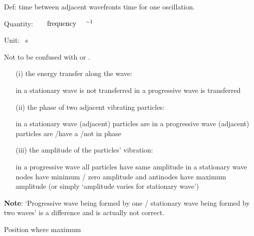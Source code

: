 \begin{question}%

  Def: time between adjacent wavefronts \OR time for one oscillation.

  Quantity: $\text{\refterm{frequency}}\ ^{-1}$

  Unit: \SI{}{s}

  Not to be confused with  or .
\end{question}

\begin{question}%

  \begin{itemize}
    \item [(i)] the energy transfer along the wave:
      
      in a stationary wave  is not transferred \OR in a progressive wave  is transferred~\hfill{}

    \item [(ii)] the phase of two adjacent vibrating particles:

      in a stationary wave (adjacent) particles are  \OR in a progressive wave (adjacent) particles are /have a /not in phase~\hfill{}

    \item [(iii)] the amplitude of the particles' vibration:

      in a progressive wave all particles have same amplitude \OR in a stationary wave nodes have minimum / zero amplitude and antinodes have maximum amplitude
        (or simply `amplitude varies for stationary wave')~\hfill{}
  \end{itemize}

  \textbf{Note}: `Progressive wave being formed by one / stationary wave being formed by two waves' is \NOT a difference and is actually not correct.
\end{question}

\begin{question}%

  Position where maximum ~\hfill{}
\end{question}

